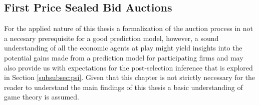 \documentclass[a4paper,12pt, headsepline]{scrartcl}
\numberwithin{equation}{section}
\begin{document}
\subsection{First Price Sealed Bid Auctions}\label{subsec:fpsba}

For the applied nature of this thesis a formalization of the auction process in not a necesary prerequisite 
for a good prediction model, however, a sound understanding of all the economic agents at play might yield insights into the potential gains made from a prediction model for participating firms and may also provide us with expectations for the post-selection inference that is explored in Section \ref{subsubsec:psi}. Given that this chapter is not strictly necessary for the reader to understand the main findings of this thesis a basic understanding of game theory is assumed.\\
\end{document}
